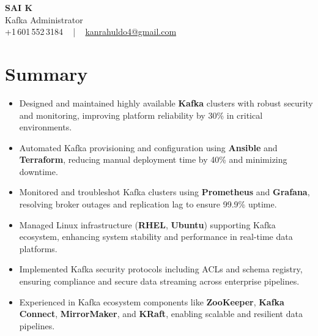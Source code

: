 \documentclass[letterpaper,11pt]{article}
\newcommand{\resumeItem}[1]{
  \item\footnotesize{
    {#1 \vspace{-2pt}}
  }
}
\newcommand{\resumeItemListStart}{\begin{itemize}[leftmargin=*]}
\newcommand{\resumeItemListEnd}{\end{itemize}\vspace{-5pt}}
\begin{document}
\begin{center}
    {\fontsize{14pt}{12pt}\selectfont \textbf{\MakeUppercase{Sai K}}}\\ \vspace{2pt}
    \fontsize{10pt}{12pt}\selectfont Kafka Administrator\\ \vspace{2pt}
    \fontsize{10pt}{12pt}\selectfont +1\,601\,552\,3184 ~ | ~
    \href{mailto:kanrahuldo4@gmail.com}{kanrahuldo4@gmail.com}
    \vspace{-10pt}
\end{center}

\section{Summary}
\fontsize{9pt}{10pt}\selectfont
\resumeItemListStart
  \resumeItem{Designed and maintained highly available \textbf{Kafka} clusters with robust security and monitoring, improving platform reliability by 30\% in critical environments.}
  \resumeItem{Automated Kafka provisioning and configuration using \textbf{Ansible} and \textbf{Terraform}, reducing manual deployment time by 40\% and minimizing downtime.}
  \resumeItem{Monitored and troubleshot Kafka clusters using \textbf{Prometheus} and \textbf{Grafana}, resolving broker outages and replication lag to ensure 99.9\% uptime.}
  \resumeItem{Managed Linux infrastructure (\textbf{RHEL}, \textbf{Ubuntu}) supporting Kafka ecosystem, enhancing system stability and performance in real-time data platforms.}
  \resumeItem{Implemented Kafka security protocols including ACLs and schema registry, ensuring compliance and secure data streaming across enterprise pipelines.}
  \resumeItem{Experienced in Kafka ecosystem components like \textbf{ZooKeeper}, \textbf{Kafka Connect}, \textbf{MirrorMaker}, and \textbf{KRaft}, enabling scalable and resilient data pipelines.}
\resumeItemListEnd
\vspace{-6pt}

\end{document}
